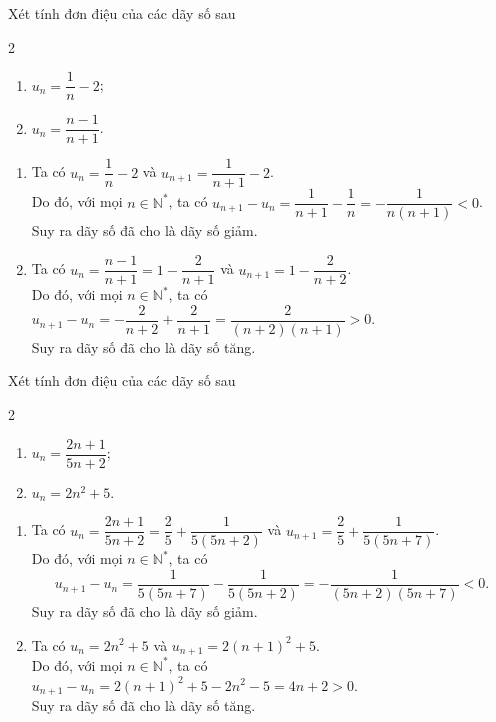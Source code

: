 \begin{bt}%
	Xét tính đơn điệu của các dãy số sau
	\begin{multicols}{2}
		\begin{enumerate}
			\item $u_n=\dfrac{1}{n}-2$;
			\item $u_n=\dfrac{n-1}{n+1}$.
		\end{enumerate}
	\end{multicols}
	\loigiai 
	{
	\begin{enumerate}
		\item Ta có $u_n=\dfrac{1}{n}-2$ và $u_{n+1}=\dfrac{1}{n+1}-2$.\\
		Do đó, với mọi $n\in \mathbb{N}^*$, ta có $u_{n+1}-u_n=\dfrac{1}{n+1}-\dfrac{1}{n}=-\dfrac{1}{n(n+1)}<0$.\\
		Suy ra dãy số đã cho là dãy số giảm.
		\item Ta có $u_n=\dfrac{n-1}{n+1}=1-\dfrac{2}{n+1}$ và $u_{n+1}=1-\dfrac{2}{n+2}$.\\
		Do đó, với mọi $n\in \mathbb{N}^*$, ta có $u_{n+1}-u_n=-\dfrac{2}{n+2}+\dfrac{2}{n+1}=\dfrac{2}{(n+2)(n+1)}>0$.\\
		Suy ra dãy số đã cho là dãy số tăng.
	\end{enumerate}
	}
\end{bt}

\begin{bt}%
	Xét tính đơn điệu của các dãy số sau
	\begin{multicols}{2}
		\begin{enumerate}
			\item $u_n=\dfrac{2n+1}{5n+2}$;
			\item $u_n=2n^2+5$.
		\end{enumerate}
	\end{multicols}
	\loigiai 
	{
		\begin{enumerate}
			\item Ta có $u_n=\dfrac{2n+1}{5n+2}=\dfrac{2}{5}+\dfrac{1}{5(5n+2)}$ và $u_{n+1}=\dfrac{2}{5}+\dfrac{1}{5(5n+7)}$.\\
			Do đó, với mọi $n\in \mathbb{N}^*$, ta có $$u_{n+1}-u_n=\dfrac{1}{5(5n+7)}-\dfrac{1}{5(5n+2)}=-\dfrac{1}{(5n+2)(5n+7)}<0.$$
			Suy ra dãy số đã cho là dãy số giảm.
			\item Ta có $u_n=2n^2+5$ và $u_{n+1}=2(n+1)^2+5$.\\
			Do đó, với mọi $n\in \mathbb{N}^*$, ta có $u_{n+1}-u_n=2(n+1)^2+5-2n^2-5=4n+2>0$.\\
			Suy ra dãy số đã cho là dãy số tăng.
		\end{enumerate}
	}
\end{bt}

